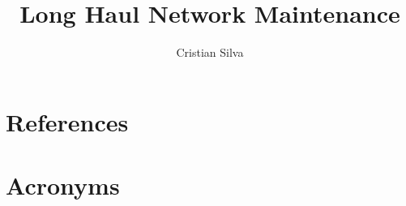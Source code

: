 \documentclass[PMO,lsstdraft,authoryear,toc]{lsstdoc}
\title{Long Haul Network Maintenance}
\author{%
Cristian Silva
}
\date{\vcsDate}
\begin{document}
\maketitle


\appendix
\section{References} \label{sec:bib}
\renewcommand{\refname}{} %


\section{Acronyms} \label{sec:acronyms}

\end{document}

